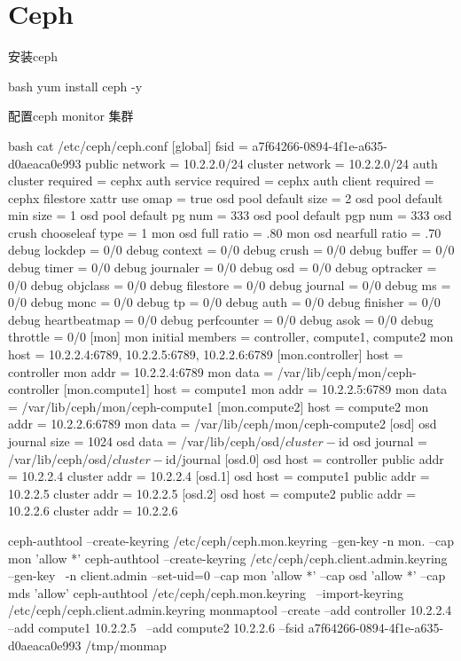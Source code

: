 \chapter{Ceph}

\begin{outline}[enumerate]
  \1 安装ceph
\begin{code-block}{bash}
yum install ceph -y
\end{code-block}

  \1 配置ceph monitor 集群
\begin{code-block}{bash}
cat /etc/ceph/ceph.conf
[global]
fsid = a7f64266-0894-4f1e-a635-d0aeaca0e993
public network = 10.2.2.0/24
cluster network = 10.2.2.0/24
auth cluster required = cephx
auth service required = cephx
auth client required = cephx
filestore xattr use omap = true
osd pool default size = 2
osd pool default min size = 1
osd pool default pg num = 333
osd pool default pgp num = 333
osd crush chooseleaf type = 1
mon osd full ratio = .80
mon osd nearfull ratio = .70
debug lockdep = 0/0
debug context = 0/0
debug crush = 0/0
debug buffer = 0/0
debug timer = 0/0
debug journaler = 0/0
debug osd = 0/0
debug optracker = 0/0
debug objclass = 0/0
debug filestore = 0/0
debug journal = 0/0
debug ms = 0/0
debug monc = 0/0
debug tp = 0/0
debug auth = 0/0
debug finisher = 0/0
debug heartbeatmap = 0/0
debug perfcounter = 0/0
debug asok = 0/0
debug throttle = 0/0
[mon]
mon initial members = controller, compute1, compute2
mon host = 10.2.2.4:6789, 10.2.2.5:6789, 10.2.2.6:6789
[mon.controller]
host = controller
mon addr = 10.2.2.4:6789
mon data = /var/lib/ceph/mon/ceph-controller
[mon.compute1]
host = compute1
mon addr = 10.2.2.5:6789
mon data = /var/lib/ceph/mon/ceph-compute1
[mon.compute2]
host = compute2
mon addr = 10.2.2.6:6789
mon data = /var/lib/ceph/mon/ceph-compute2
[osd]
osd journal size = 1024
osd data = /var/lib/ceph/osd/$cluster-$id
osd journal = /var/lib/ceph/osd/$cluster-$id/journal
[osd.0]
osd host = controller
public addr = 10.2.2.4
cluster addr = 10.2.2.4
[osd.1]
osd host = compute1
public addr = 10.2.2.5
cluster addr = 10.2.2.5
[osd.2]
osd host = compute2
public addr = 10.2.2.6
cluster addr = 10.2.2.6

ceph-authtool --create-keyring /etc/ceph/ceph.mon.keyring --gen-key -n mon. --cap mon 'allow *'
ceph-authtool --create-keyring /etc/ceph/ceph.client.admin.keyring --gen-key \
    -n client.admin --set-uid=0 --cap mon 'allow *' --cap osd 'allow *' --cap mds 'allow'
ceph-authtool /etc/ceph/ceph.mon.keyring \
    --import-keyring /etc/ceph/ceph.client.admin.keyring
monmaptool --create --add controller 10.2.2.4 --add compute1 10.2.2.5 \
    --add compute2 10.2.2.6  --fsid a7f64266-0894-4f1e-a635-d0aeaca0e993 /tmp/monmap


\end{code-block}
\end{outline}
